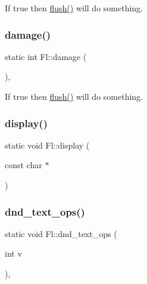 If true then \hyperlink{class_fl_a0c4992c95528e8bc79ae258e75c0fcd7}{flush()} will do something. \mbox{\label{class_fl_ac5e4de1119ebb169c8a8de4c81a4cb59}} 
\subsubsection{\texorpdfstring{damage()}{damage()}\hspace{0.1cm}{\footnotesize\ttfamily [2/2]}}
{\footnotesize\ttfamily static int Fl\+::damage (\begin{DoxyParamCaption}{ }\end{DoxyParamCaption})\hspace{0.3cm}{\ttfamily [inline]}, {\ttfamily [static]}}

If true then \hyperlink{class_fl_a0c4992c95528e8bc79ae258e75c0fcd7}{flush()} will do something. \mbox{\label{class_fl_a8b086d663a79f110e056c13a0522dc31}} 
\subsubsection{\texorpdfstring{display()}{display()}}
{\footnotesize\ttfamily static void Fl\+::display (\begin{DoxyParamCaption}\item[{const char $\ast$}]{ }\end{DoxyParamCaption})\hspace{0.3cm}{\ttfamily [static]}}

\mbox{\label{class_fl_a53430e25b53f3b608193fa4009898463}} 
\subsubsection{\texorpdfstring{dnd\+\_\+text\+\_\+ops()}{dnd\_text\_ops()}\hspace{0.1cm}{\footnotesize\ttfamily [1/2]}}
{\footnotesize\ttfamily static void Fl\+::dnd\+\_\+text\+\_\+ops (\begin{DoxyParamCaption}\item[{int}]{v }\end{DoxyParamCaption})\hspace{0.3cm}{\ttfamily [inline]}, {\ttfamily [static]}}

